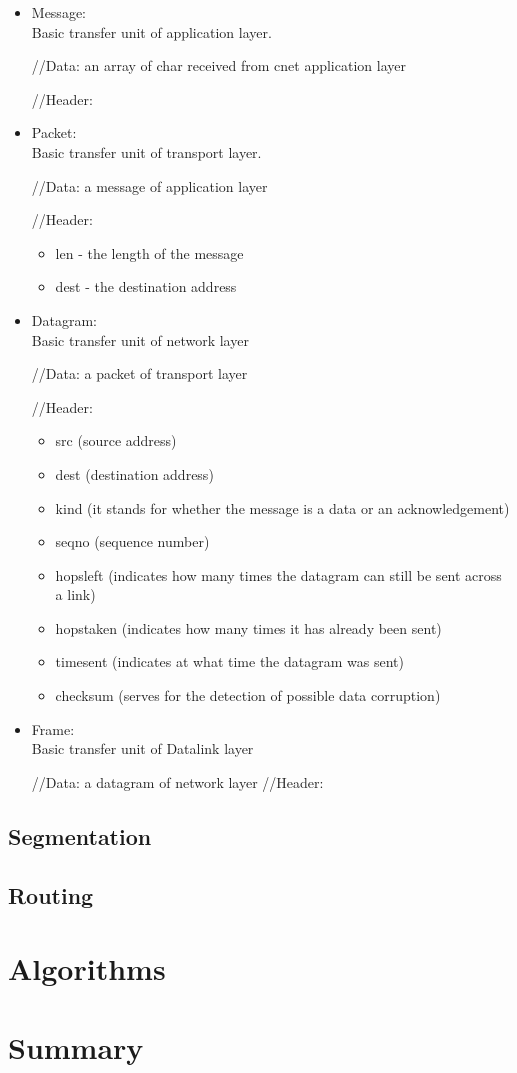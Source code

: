 \documentclass{article}
\begin{document}
\begin{itemize}
  \item Message: \\
  Basic transfer unit of application layer. 
  
  //Data:  an array of char received from cnet application layer
  
  //Header:
  \item Packet: \\
  Basic transfer unit of transport layer. 
  
  //Data:  a message of application layer
  
  //Header:  
  \begin{itemize}
    \item len - the length of the message
    \item dest - the destination address
    \end{itemize}
  
  \item Datagram: \\
   Basic transfer unit of network layer
   
   //Data: a packet of transport layer
   
   //Header: 
   \begin{itemize}
     \item src (source address)
     \item dest (destination address)
     \item kind (it stands for whether the message is a data 
     or an acknowledgement)
     \item seqno (sequence number)
     \item hopsleft (indicates how many times the datagram 
     can still be sent across a link)
     \item hopstaken  (indicates how many times it has already been sent)
    \item timesent (indicates at what time the datagram was sent)
   \item checksum (serves for the detection of possible data corruption)
\end{itemize}

\item Frame: \\

 Basic transfer unit of Datalink layer
 
 //Data: a datagram of network layer
 //Header:
 \end{itemize}

\subsection{Segmentation}

\subsection{Routing}

\section{Algorithms}

\section{Summary}
\end{document}
